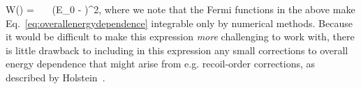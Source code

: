 \beq
W(\Ebeta) =  \, \FF \, \xi \, \pe \Ee (E_0 - \Ee)^2,
\label{eq:overallenergydependence}
\eeq
{}
where we note that the Fermi functions in the above make Eq.~\ref{eq:overallenergydependence} integrable only by numerical methods.  Because it would be difficult to make this expression \emph{more} challenging to work with, there is little drawback to including in this expression any small corrections to overall energy dependence that might arise from e.g.\! recoil-order corrections, as described by Holstein~\cite{holstein}.

